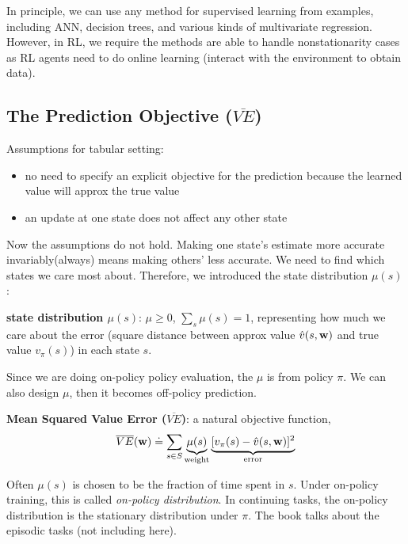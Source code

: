 \documentclass[sutton_barto_notes.tex]{subfiles}
\begin{document}
In principle, we can use any method for supervised learning from examples, including ANN, decision trees, and various kinds of multivariate regression.
However, in RL, we require the methods are able to handle nonstationarity cases as RL agents need to do online learning (interact with the environment to obtain data).

\subsection{The Prediction Objective ($\overline{VE}$)}

Assumptions for tabular setting:

\begin{itemize}
\item no need to specify an explicit objective for the prediction because the learned value will approx the true value
\item an update at one state does not affect any other state
\end{itemize}

Now the assumptions do not hold. Making one state's estimate more accurate invariably(always) means making others' less accurate. We need to find which states we care most about. Therefore, we introduced the state distribution $\mu(s)$:
\begin{definition}
\textbf{state distribution $\mu(s)$}: $\mu \geq 0$, $\sum_s \mu(s) = 1$, representing how much we care about the error (square distance between approx value $\hat{v}(s,{\operatorname*{\mathbf{w}}})$ and true value $v_\pi(s)$) in each state $s$.
\end{definition}

Since we are doing on-policy policy evaluation, the $\mu$ is from policy $\pi$. We can also design $\mu$, then it becomes off-policy prediction.

\begin{definition}
\textbf{Mean Squared Value Error ($\overline{VE}$)}: a natural objective function,
$$\overline{VE}({\operatorname*{\mathbf{w}}}) \doteq \sum_{s\in S} \underbrace{\mu(s)}_{\text{weight}} \underbrace{[v_\pi(s) - \hat{v}(s,{\operatorname*{\mathbf{w}}})]^2}_{\text{error}}$$
\end{definition}

Often $\mu(s)$ is chosen to be the fraction of time spent in $s$. Under on-policy training, this is called \textit{on-policy distribution}. In continuing tasks, the on-policy distribution is the stationary distribution under $\pi$. The book talks about the episodic tasks (not including here).
\end{document}
